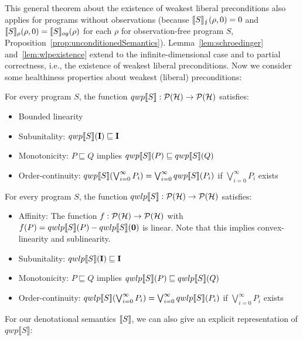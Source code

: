 \documentclass[a4paper,UKenglish,cleveref, autoref, thm-restate]{lipics-v2021}
\begin{document}
This general theorem about the existence of weakest liberal preconditions also applies for programs without observations (because $\llbracket S \rrbracket_{\lightning}(\rho,0)=0$ and $\llbracket S \rrbracket_{\rho}(\rho,0)=\llbracket S \rrbracket_{og}(\rho)$ for each $\rho$ for observation-free program $S$, Proposition~\ref{prop:unconditionedSemantics}).
Lemma~\ref{lem:schroedinger} and~\ref{lem:wlpexistence} extend \cite{DHondtWeakestPreconditions} to the infinite-dimensional case and to partial correctness, i.e., the existence of weakest liberal preconditions.
Now we consider some healthiness properties about weakest (liberal) preconditions: \begin{proposition}
    \label{prop:healthWP}
    For every program $S$, the function $qwp\llbracket S \rrbracket:\mathcal{P}(\mathcal{H}) \to \mathcal{P}(\mathcal{H})$ satisfies:
    \begin{itemize}
        \item Bounded linearity
        \item Subunitality: $qwp\llbracket S \rrbracket (\textbf{I})\sqsubseteq \textbf{I}$
        \item Monotonicity: $P\sqsubseteq Q$ implies $qwp\llbracket S \rrbracket (P)\sqsubseteq qwp\llbracket S \rrbracket (Q)$
        \item Order-continuity: $qwp\llbracket S \rrbracket (\bigvee_{i=0}^\infty P_i) = \bigvee_{i=0}^\infty qwp\llbracket S \rrbracket (P_i)$ if $\bigvee_{i=0}^\infty P_i$ exists
    \end{itemize}
\end{proposition}
\begin{proposition} \label{prop:healthWLP}
    For every program $S$, the function $qwlp\llbracket S \rrbracket:\mathcal{P}(\mathcal{H}) \to \mathcal{P}(\mathcal{H})$ satisfies:
    \begin{itemize}
        \item Affinity: The function $f:\mathcal{P}(\mathcal{H}) \to \mathcal{P}(\mathcal{H})$ with $f(P)=qwlp\llbracket S \rrbracket (P) - qwlp\llbracket S \rrbracket (\mathbf{0})$ is linear.
        Note that this implies convex-linearity and sublinearity.
       \item Subunitality: $qwlp\llbracket S \rrbracket (\textbf{I})\sqsubseteq \textbf{I}$
        \item Monotonicity: $P\sqsubseteq Q$ implies $qwlp\llbracket S \rrbracket (P)\sqsubseteq qwlp\llbracket S \rrbracket (Q)$
        \item Order-continuity: $qwlp\llbracket S \rrbracket (\bigvee_{i=0}^\infty P_i) = \bigvee_{i=0}^\infty qwlp\llbracket S \rrbracket (P_i)$ if $\bigvee_{i=0}^\infty P_i$ exists
    \end{itemize}
\end{proposition}
For our denotational semantics $\llbracket S \rrbracket$, we can also give an explicit representation of $qwp\llbracket S \rrbracket$:
\end{document}
